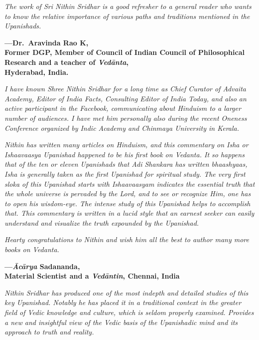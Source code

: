 \emph{The work of Sri Nithin Sridhar is a good refresher to a general reader who wants to know the relative importance of various paths and traditions mentioned in the Upanishads.}
\medskip

\begin{flushright}
\textbf{---Dr.\ Aravinda Rao K,}\\
\textbf{Former DGP, Member of Council of Indian Council of Philosophical Research and a teacher of \emph{Vedānta},}\\
\textbf{Hyderabad, India.}
\end{flushright}
\medskip

\emph{I have known Shree Nithin Sridhar for a long time as Chief Curator of Advaita Academy, Editor of India Facts, Consulting Editor of India Today, and also an active participant in the Facebook, communicating about Hinduism to a larger number of audiences. I have met him personally also during the recent Oneness Conference organized by Indic Academy and Chinmaya University in Kerala.}

\emph{Nithin has written many articles on Hinduism, and this commentary on Isha or Ishaavaasya Upanishad happened to be his first book on Vedanta. It so happens that of the ten or eleven Upanishads that Adi Shankara has written bhaashyaas, Isha is generally taken as the first Upanishad for spiritual study. The very first sloka of this Upanishad starts with Ishaavaasyam indicates the essential truth that the whole universe is pervaded by the Lord, and to see or recognize Him, one has to open his wisdom-eye. The intense study of this Upanishad helps to accomplish that. This commentary is written in a lucid style that an earnest seeker can easily understand and visualize the truth expounded by the Upanishad.}

\emph{Hearty congratulations to Nithin and wish him all the best to author many more books on Vedanta.}
\medskip

\begin{flushright}
\textbf{---\emph{Ācārya} Sadananda,}\\
\textbf{Material Scientist and a \emph{Vedāntin}, Chennai, India}
\end{flushright}
\medskip

\emph{Nithin Sridhar has produced one of the most indepth and detailed studies of this key Upanishad. Notably he has placed it in a traditional context in the greater field of Vedic knowledge and culture, which is seldom properly examined. Provides a new and insightful view of the Vedic basis of the Upanishadic mind and its approach to truth and reality.}
\medskip

